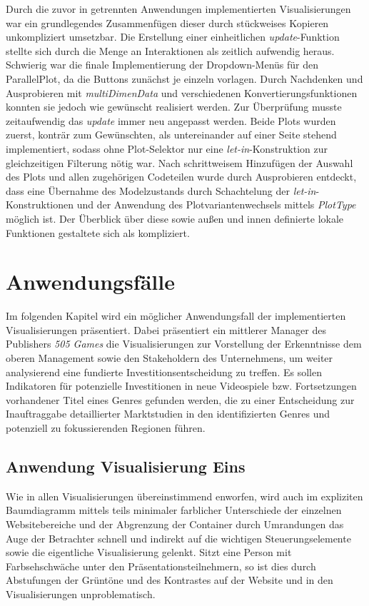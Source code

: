 \documentclass[usegeometry=true]{scrartcl}
\begin{document}
Durch die zuvor in getrennten Anwendungen implementierten Visualisierungen war ein grundlegendes Zusammenfügen dieser 
durch stückweises Kopieren unkompliziert umsetzbar.
Die Erstellung einer einheitlichen \textit{update}-Funktion stellte sich durch die Menge an Interaktionen als zeitlich aufwendig heraus.
Schwierig war die finale Implementierung der Dropdown-Menüs für den ParallelPlot, da die Buttons zunächst je einzeln vorlagen. 
Durch Nachdenken und Ausprobieren mit \textit{multiDimenData} und verschiedenen Konvertierungsfunktionen konnten sie jedoch wie gewünscht realisiert werden.
Zur Überprüfung musste zeitaufwendig das \textit{update} immer neu angepasst werden.
Beide Plots wurden zuerst, konträr zum Gewünschten, als untereinander auf einer Seite stehend implementiert, 
sodass ohne Plot-Selektor nur eine \textit{let-in}-Konstruktion zur gleichzeitigen Filterung nötig war.
Nach schrittweisem Hinzufügen der Auswahl des Plots und allen zugehörigen Codeteilen wurde durch Ausprobieren entdeckt, 
dass eine Übernahme des Modelzustands durch Schachtelung der \textit{let-in}-Konstruktionen 
und der Anwendung des Plotvariantenwechsels mittels \textit{PlotType} möglich ist. 
Der Überblick über diese sowie außen und innen definierte lokale Funktionen gestaltete sich als kompliziert.

\section{Anwendungsfälle}
Im folgenden Kapitel wird ein möglicher Anwendungsfall der implementierten Visualisierungen präsentiert.
Dabei präsentiert ein mittlerer Manager des Publishers \textit{505 Games} die Visualisierungen zur Vorstellung der Erkenntnisse dem oberen Management sowie den Stakeholdern des Unternehmens, um weiter analysierend eine fundierte Investitionsentscheidung zu treffen. 
Es sollen Indikatoren für potenzielle Investitionen in neue Videospiele bzw. Fortsetzungen vorhandener Titel eines Genres gefunden werden, die zu einer Entscheidung zur Inauftraggabe detaillierter Marktstudien in den identifizierten Genres und potenziell zu fokussierenden Regionen führen.

\subsection{Anwendung Visualisierung Eins}
Wie in allen Visualisierungen übereinstimmend enworfen, wird auch im expliziten Baumdiagramm mittels teils minimaler farblicher Unterschiede der einzelnen Websitebereiche und der Abgrenzung der Container durch Umrandungen 
das Auge der Betrachter schnell und indirekt auf die wichtigen Steuerungselemente sowie die eigentliche Visualisierung gelenkt.
Sitzt eine Person mit Farbsehschwäche unter den Präsentationsteilnehmern, so ist dies durch Abstufungen der Grüntöne und des Kontrastes auf der Website und in den Visualisierungen unproblematisch. 
\end{document}
